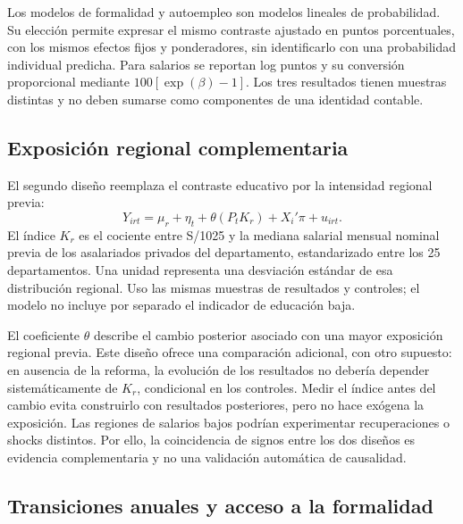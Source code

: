 Los modelos de formalidad y autoempleo son modelos lineales de probabilidad. Su elección permite expresar el mismo contraste ajustado en puntos porcentuales, con los mismos efectos fijos y ponderadores, sin identificarlo con una probabilidad individual predicha. Para salarios se reportan log puntos y su conversión proporcional mediante $100[\exp(\beta)-1]$. Los tres resultados tienen muestras distintas y no deben sumarse como componentes de una identidad contable.

\subsection{Exposición regional complementaria}

El segundo diseño reemplaza el contraste educativo por la intensidad regional previa:
\begin{equation}
Y_{irt}=\mu_r+\eta_t+\theta(P_tK_r)+X_i'\pi+u_{irt}.
\label{eq:short_regional}
\end{equation}
El índice $K_r$ es el cociente entre S/1025 y la mediana salarial mensual nominal previa de los asalariados privados del departamento, estandarizado entre los 25 departamentos. Una unidad representa una desviación estándar de esa distribución regional. Uso las mismas muestras de resultados y controles; el modelo no incluye por separado el indicador de educación baja.

El coeficiente $\theta$ describe el cambio posterior asociado con una mayor exposición regional previa. Este diseño ofrece una comparación adicional, con otro supuesto: en ausencia de la reforma, la evolución de los resultados no debería depender sistemáticamente de $K_r$, condicional en los controles. Medir el índice antes del cambio evita construirlo con resultados posteriores, pero no hace exógena la exposición. Las regiones de salarios bajos podrían experimentar recuperaciones o shocks distintos. Por ello, la coincidencia de signos entre los dos diseños es evidencia complementaria y no una validación automática de causalidad.

\subsection{Transiciones anuales y acceso a la formalidad}

